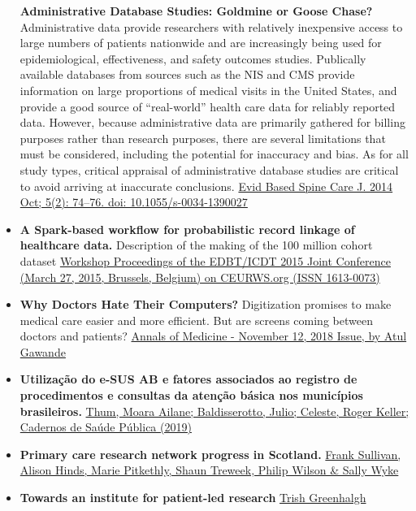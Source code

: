 \documentclass[]{book}
\begin{document}
\begin{itemize}
  \textbf{Administrative Database Studies: Goldmine or Goose Chase?} Administrative data provide researchers with relatively inexpensive access to large numbers of patients nationwide and are increasingly being used for epidemiological, effectiveness, and safety outcomes studies. Publically available databases from sources such as the NIS and CMS provide information on large proportions of medical visits in the United States, and provide a good source of ``real-world'' health care data for reliably reported data. However, because administrative data are primarily gathered for billing purposes rather than research purposes, there are several limitations that must be considered, including the potential for inaccuracy and bias. As for all study types, critical appraisal of administrative database studies are critical to avoid arriving at inaccurate conclusions. \href{https://www.ncbi.nlm.nih.gov/pmc/articles/PMC4174180/pdf/10-1055-s-0034-1390027.pdf}{Evid Based Spine Care J. 2014 Oct; 5(2): 74--76. doi: 10.1055/s-0034-1390027}
\item
  \textbf{A Spark-based workflow for probabilistic record linkage of healthcare data.} Description of the making of the 100 million cohort dataset \href{http://ceur-ws.org/Vol-1330/paper-04.pdf}{Workshop Proceedings of the EDBT/ICDT 2015 Joint Conference (March 27, 2015, Brussels, Belgium) on CEURWS.org (ISSN 1613-0073)}
\item
  \textbf{Why Doctors Hate Their Computers?} Digitization promises to make medical care easier and more efficient. But are screens coming between doctors and patients? \href{https://www.newyorker.com/magazine/2018/11/12/why-doctors-hate-their-computers}{Annals of Medicine - November 12, 2018 Issue, by Atul Gawande}
\item
  \textbf{Utilização do e-SUS AB e fatores associados ao registro de procedimentos e consultas da atenção básica nos municípios brasileiros.} \href{http://www.scielo.br/pdf/csp/v35n2/1678-4464-csp-35-02-e00029418.pdf}{Thum, Moara Ailane; Baldisserotto, Julio; Celeste, Roger Keller; Cadernos de Saúde Pública (2019)}
\item
  \textbf{Primary care research network progress in Scotland.} \href{https://www.tandfonline.com/doi/pdf/10.3109/13814788.2013.879116?needAccess=true}{Frank Sullivan, Alison Hinds, Marie Pitkethly, Shaun Treweek, Philip Wilson \& Sally Wyke}
\item
  \textbf{Towards an institute for patient-led research} \href{https://blogs.bmj.com/bmj/2019/11/12/trisha-greenhalgh-towards-an-institute-for-patient-led-research/}{Trish Greenhalgh}

\end{itemize}
\end{document}

